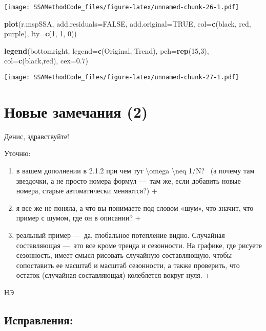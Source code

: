 \documentclass[
]{article}
\newenvironment{Shaded}{\begin{snugshade}}{\end{snugshade}}
\newcommand{\AttributeTok}[1]{\textcolor[rgb]{0.13,0.29,0.53}{#1}}
\newcommand{\ConstantTok}[1]{\textcolor[rgb]{0.56,0.35,0.01}{#1}}
\newcommand{\DecValTok}[1]{\textcolor[rgb]{0.00,0.00,0.81}{#1}}
\newcommand{\FloatTok}[1]{\textcolor[rgb]{0.00,0.00,0.81}{#1}}
\newcommand{\FunctionTok}[1]{\textcolor[rgb]{0.13,0.29,0.53}{\textbf{#1}}}
\newcommand{\NormalTok}[1]{#1}
\newcommand{\StringTok}[1]{\textcolor[rgb]{0.31,0.60,0.02}{#1}}
\begin{document}
\texttt{[image: SSAMethodCode\_files/figure-latex/unnamed-chunk-26-1.pdf]}

\begin{Shaded}
\begin{Highlighting}[]
\FunctionTok{plot}\NormalTok{(r.mspSSA, }\AttributeTok{add.residuals=}\ConstantTok{FALSE}\NormalTok{, }\AttributeTok{add.original=}\ConstantTok{TRUE}\NormalTok{, }\AttributeTok{col=}\FunctionTok{c}\NormalTok{(}\StringTok{\textquotesingle{}black\textquotesingle{}}\NormalTok{, }\StringTok{\textquotesingle{}red\textquotesingle{}}\NormalTok{, }\StringTok{\textquotesingle{}purple\textquotesingle{}}\NormalTok{), }\AttributeTok{lty=}\FunctionTok{c}\NormalTok{(}\DecValTok{1}\NormalTok{, }\DecValTok{1}\NormalTok{, }\DecValTok{0}\NormalTok{))}

\FunctionTok{legend}\NormalTok{(}\StringTok{\textquotesingle{}bottomright\textquotesingle{}}\NormalTok{, }\AttributeTok{legend=}\FunctionTok{c}\NormalTok{(}\StringTok{\textquotesingle{}Original\textquotesingle{}}\NormalTok{, }\StringTok{\textquotesingle{}Trend\textquotesingle{}}\NormalTok{), }\AttributeTok{pch=}\FunctionTok{rep}\NormalTok{(}\DecValTok{15}\NormalTok{,}\DecValTok{3}\NormalTok{), }\AttributeTok{col=}\FunctionTok{c}\NormalTok{(}\StringTok{\textquotesingle{}black\textquotesingle{}}\NormalTok{,}\StringTok{\textquotesingle{}red\textquotesingle{}}\NormalTok{), }\AttributeTok{cex=}\FloatTok{0.7}\NormalTok{)}
\end{Highlighting}
\end{Shaded}

\texttt{[image: SSAMethodCode\_files/figure-latex/unnamed-chunk-27-1.pdf]}

\section{Новые замечания
(2)}\label{ux43dux43eux432ux44bux435-ux437ux430ux43cux435ux447ux430ux43dux438ux44f-2}

Денис, здравствуйте!

Уточню:~

\begin{enumerate}
\def\labelenumi{\arabic{enumi}.}
\item
  в вашем дополнении в 2.1.2 при чем тут \textbackslash omega
  \textbackslash neq 1/N?~ (а почему там звездочки, а не просто номера
  формул ---~там же, если добавить новые номера, старые автоматически
  меняются?) +
\item
  я все же не поняла, а что вы понимаете под словом «шум», что значит,
  что пример с шумом, где он в описании? +
\item
  реальный пример ---~да, глобальное потепление видно. Случайная
  составляющая ---~это все кроме тренда и сезонности. На графике, где
  рисуете сезонность, имеет смысл рисовать случайную составляющую, чтобы
  сопоставить ее масштаб и масштаб сезонности, а также проверить, что
  остаток (случайная составляющая) колеблется вокруг нуля. +
\end{enumerate}

НЭ

\subsection{Исправления:}\label{ux438ux441ux43fux440ux430ux432ux43bux435ux43dux438ux44f}
\end{document}

